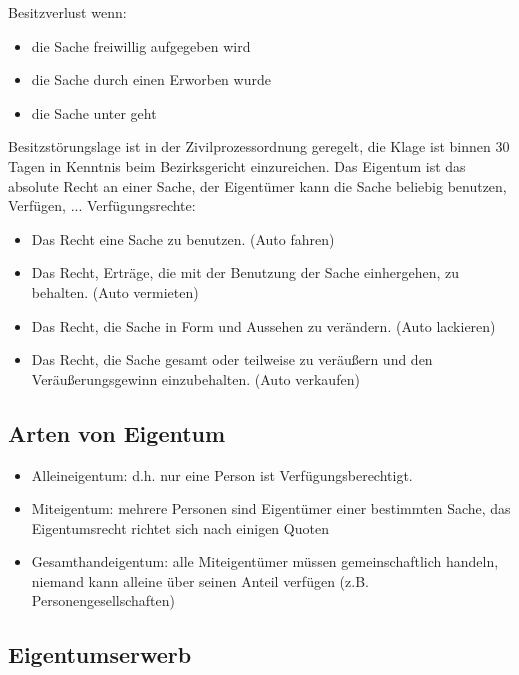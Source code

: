 \documentclass[a4paper]{report}
\begin{document}
Besitzverlust wenn:

\begin{itemize}
\item die Sache freiwillig aufgegeben wird
\item die Sache durch einen Erworben wurde
\item die Sache unter geht
\end{itemize}

Besitzstörungslage ist in der Zivilprozessordnung geregelt, die Klage ist binnen 30 Tagen in Kenntnis beim Bezirksgericht einzureichen. Das Eigentum ist das absolute Recht an einer Sache, der Eigentümer kann die Sache beliebig  benutzen, Verfügen, ...
\newline
\newline
Verfügungsrechte:

\begin{itemize}
\item Das Recht eine Sache zu benutzen. (Auto fahren)
\item Das Recht, Erträge, die mit der Benutzung der Sache einhergehen, zu behalten. (Auto vermieten)
\item Das Recht, die Sache in Form und Aussehen zu verändern. (Auto lackieren)
\item Das Recht, die Sache gesamt oder teilweise zu veräußern und den Veräußerungsgewinn einzubehalten. (Auto verkaufen)
\end{itemize}

\subsection{Arten von Eigentum}

\begin{itemize}
\item Alleineigentum: d.h. nur eine Person ist Verfügungsberechtigt.
\item Miteigentum: mehrere Personen sind Eigentümer einer bestimmten Sache, das Eigentumsrecht richtet sich nach einigen Quoten 
\item Gesamthandeigentum: alle Miteigentümer müssen gemeinschaftlich handeln, niemand kann alleine über seinen Anteil verfügen (z.B. Personengesellschaften)
\end{itemize}

\subsection{Eigentumserwerb}
\end{document}
